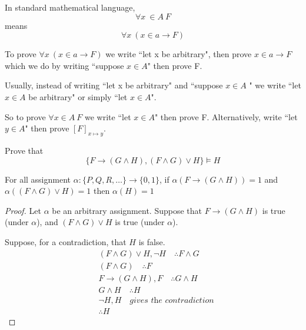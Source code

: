 \begin{note}
In standard mathematical language, $$\forall x \ \in A  \ F$$ means $$\forall x \ (x\in a \to F)$$


To prove $\forall x \ (x\in a \to F)$ we write ``let x be arbitrary", then prove $x\in a \to F$ which we do by writing ``suppose $x\in A$" then prove F.

Usually, instead of writing ``let x be arbitrary" and ``suppose $x\in A$ " we write ``let $x\in A$ be arbitrary" or simply ``let $x\in A$".

So to prove $\forall x \in A \ F$ we write ``let $x\in A$" then prove F. Alternatively, write ``let $y\in A$" then prove $[F]_{x\mapsto y}$.

\end{note}

\begin{exmp}
Prove that $$\{F\to (G\wedge H),(F\wedge G) \vee H\}\vDash H$$
\end{exmp}

For all assignment $\alpha \colon \{P,Q,R,\dots \} \to \{0,1\}$, if  $\alpha (F\to (G\wedge H)) = 1$ and  $\alpha ((F\wedge G) \vee H) = 1$ then $\alpha (H) = 1$
\begin{proof}
Let $\alpha$ be an arbitrary assignment. Suppose that $F\to (G\wedge H)$ is true (under $\alpha$), and  $(F\wedge G) \vee H$ is true (under $\alpha$).

Suppose, for a contradiction, that $H$ is false.
\begin{align*}
   & (F\wedge G)\vee H , \neg H \quad \therefore F\wedge G\\
   & (F\wedge G) \quad \therefore F\\
   & F\to (G\wedge H) , F \quad \therefore G\wedge H\\
   & G\wedge H \quad \therefore H\\
   & \neg H , H \quad \textit{gives the contradiction} \\
   & \therefore H
\end{align*}





\end{proof}



